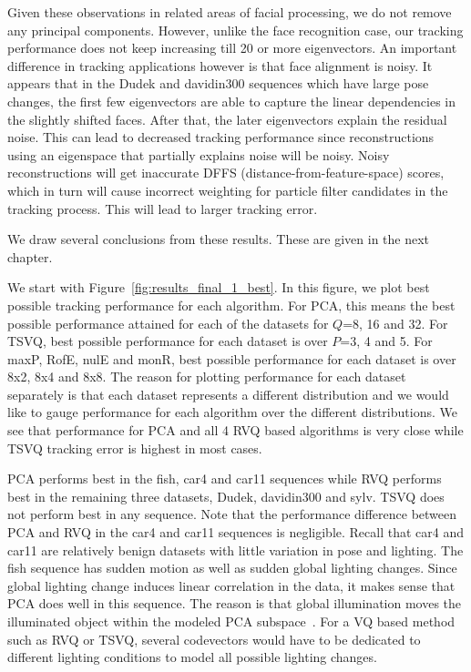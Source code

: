 Given these observations in related areas of facial processing, we do not remove any principal components.  However, unlike the face recognition case, our tracking performance does not keep increasing till 20 or more eigenvectors.  An important difference in tracking applications however is that face alignment is noisy.  It appears that in the Dudek and davidin300 sequences which have large pose changes, the first few eigenvectors are able to capture the linear dependencies in the slightly shifted faces.  After that, the later eigenvectors explain the residual noise.  This can lead to decreased tracking performance since reconstructions using an eigenspace that partially explains noise will be noisy.  Noisy reconstructions will get inaccurate DFFS (distance-from-feature-space) scores, which in turn will cause incorrect weighting for particle filter candidates in the tracking process.  This will lead to larger tracking error.



We draw several conclusions from these results.  These are given in the next chapter.




We start with Figure~\ref{fig:results_final_1_best}.  In this figure, we plot best possible tracking performance for each algorithm.  For PCA, this means the best possible performance attained for each of the datasets for $Q$=8, 16 and 32.  For TSVQ, best possible performance for each dataset is over $P$=3, 4 and 5.  For maxP, RofE, nulE and monR, best possible performance for each dataset is over 8x2, 8x4 and 8x8.  The reason for plotting performance for each dataset separately is that each dataset represents a different distribution and we would like to gauge performance for each algorithm over the different distributions.  We see that performance for PCA and all 4 RVQ based algorithms is very close while TSVQ tracking error is highest in most cases.  

PCA performs best in the fish, car4 and car11 sequences while RVQ performs best in the remaining three datasets, Dudek, davidin300 and sylv.  TSVQ does not perform best in any sequence.  Note that the performance difference between PCA and RVQ in the car4 and car11 sequences is negligible.  Recall that car4 and car11 are relatively benign datasets with little variation in pose and lighting.  The fish sequence has sudden motion as well as sudden global lighting changes.   Since global lighting change induces linear correlation in the data, it makes sense that PCA does well in this sequence.  The reason is that global illumination moves the illuminated object within the modeled PCA subspace~\cite{1987_JNL_Faces_Sirovich}.  For a VQ based method such as RVQ or TSVQ, several codevectors would have to be dedicated to different lighting conditions to model all possible lighting changes.  

